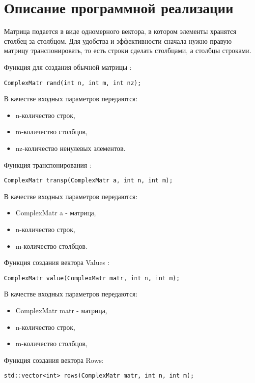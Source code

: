 \documentclass{report}
\begin{document}
\section*{Описание программной реализации}
Матрица подается в виде одномерного вектора, в котором элементы хранятся столбец за столбцом. Для удобства и эффективности сначала нужно правую матрицу транспонировать, то есть строки сделать столбцами, а столбцы строками.
\par Функция для создания обычной матрицы :
\begin{lstlisting}
ComplexMatr rand(int n, int m, int nz);
\end{lstlisting}
\par В качестве входных параметров передаются:
\begin{itemize}
\item n-количество строк,
\item m-количество столбцов,
\item nz-количество ненулевых элементов.
\end{itemize}
\par Функция транспонирования :
\begin{lstlisting}
ComplexMatr transp(ComplexMatr a, int n, int m);
\end{lstlisting}
\par В качестве входных параметров передаются:
\begin{itemize}
\item ComplexMatr a - матрица,
\item n-количество строк,
\item m-количество столбцов.
\end{itemize}
\par Функция создания вектора Values :
\begin{lstlisting}
ComplexMatr value(ComplexMatr matr, int n, int m);
\end{lstlisting}
\par В качестве входных параметров передаются:
\begin{itemize}
\item ComplexMatr matr - матрица,
\item n-количество строк,
\item m-количество столбцов,
\end{itemize}
\par Функция создания вектора Rows:
\begin{lstlisting}
std::vector<int> rows(ComplexMatr matr, int n, int m);
\end{lstlisting}
\end{document}
